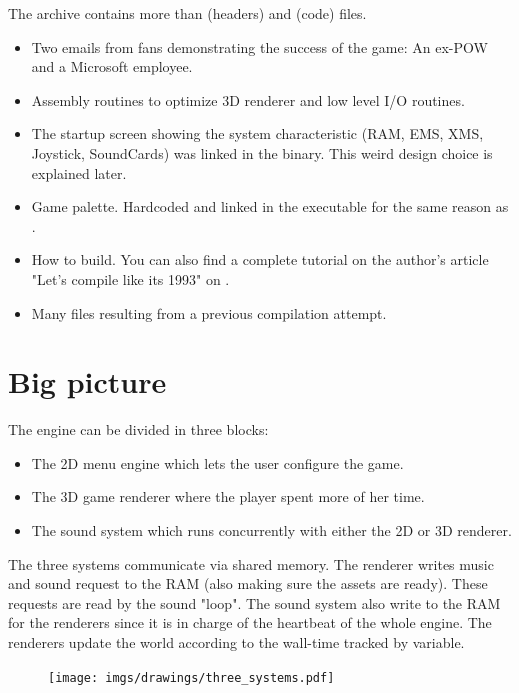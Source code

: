 \documentclass[book.tex]{subfiles}
\begin{document}
The archive contains more than  (headers) and  (code) files.
\begin{itemize}
\item {} Two emails from fans demonstrating the success of the game: An ex-POW and a Microsoft employee.
\item {} Assembly routines to optimize 3D renderer and low level I/O routines.
\item {} The startup screen showing the system characteristic (RAM, EMS, XMS, Joystick, SoundCards) was linked in the binary. This weird design choice is explained later.
\item {} Game palette. Hardcoded and linked in the executable for the same reason as .
\item {} How to build. You can also find a complete tutorial on the author's article "Let's compile like its 1993" on .
\item Many files resulting from a previous compilation attempt.
\end{itemize}







\section{Big picture}
The engine can be divided in three blocks:
\begin{itemize}
\item The 2D menu engine which lets the user configure the game.
\item The 3D game renderer where the player spent more of her time.
\item The sound system which runs concurrently with either the 2D or 3D renderer. 
\end{itemize}
The three systems communicate via shared memory. The renderer writes music and sound request to the RAM (also making sure the assets are ready). These requests are read by the sound "loop". The sound system also write to the RAM for the renderers since it is in charge of the heartbeat of the whole engine. The renderers update the world according to the wall-time tracked by  variable.
\par
\begin{figure}[H]
\centering
 \texttt{[image: imgs/drawings/three\_systems.pdf]}
 \end{figure}
 \par
\end{document}

